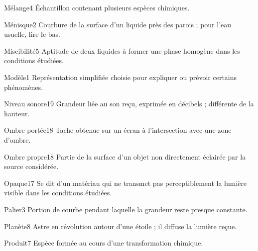\documentclass[12pt,twoside,openany]{book}
\begin{document}
\begin{pcLexique}{Mélange}{4}
Échantillon contenant plusieurs espèces chimiques.\par
\end{pcLexique}
\begin{pcLexique}{Ménisque}{2}
Courbure de la surface d’un liquide près des parois ; pour l’eau usuelle, lire le bas.\par
\end{pcLexique}
\begin{pcLexique}{Miscibilité}{5}
Aptitude de deux liquides à former une phase homogène dans les conditions étudiées.\par
\end{pcLexique}
\begin{pcLexique}{Modèle}{1}
Représentation simplifiée choisie pour expliquer ou prévoir certains phénomènes.\par
\end{pcLexique}
\begin{pcLexique}{Niveau sonore}{19}
Grandeur liée au son reçu, exprimée en décibels ; différente de la hauteur.\par
\end{pcLexique}
\begin{pcLexique}{Ombre portée}{18}
Tache obtenue sur un écran à l’intersection avec une zone d’ombre.\par
\end{pcLexique}
\begin{pcLexique}{Ombre propre}{18}
Partie de la surface d’un objet non directement éclairée par la source considérée.\par
\end{pcLexique}
\begin{pcLexique}{Opaque}{17}
Se dit d’un matériau qui ne transmet pas perceptiblement la lumière visible dans les conditions étudiées.\par
\end{pcLexique}
\begin{pcLexique}{Palier}{3}
Portion de courbe pendant laquelle la grandeur reste presque constante.\par
\end{pcLexique}
\begin{pcLexique}{Planète}{8}
Astre en révolution autour d’une étoile ; il diffuse la lumière reçue.\par
\end{pcLexique}
\begin{pcLexique}{Produit}{7}
Espèce formée au cours d’une transformation chimique.\par
\end{pcLexique}
\end{document}

